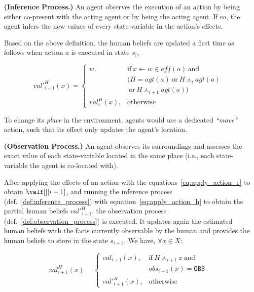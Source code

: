 \begin{definition} \label{def:inference_process}
    \textbf{(Inference Process.)} An agent observes the execution of an action by being either co-present with the acting agent 
    or by being the acting agent. If so, the agent infers the new values of every state-variable in the action's effects.
\end{definition}

Based on the above definition, the human beliefs are updated a first time as follows when action $a$ is executed in state $s_i$, 

\begin{equation} \label{eq:apply_action_h}
val'^H_{i+1}(x) = \left\{ 
\begin{array}{ll}
    w, & \mbox{if} ~ x \leftarrow w \in \textit{eff}(a) ~ \mbox{and}  \\ 
    & (H = \textit{agt}(a) ~\mbox{or}~ H \curlywedge_i \textit{agt}(a)\\
    & ~\mbox{or}~ H \curlywedge_{i+1} \textit{agt}(a))\\
    val^H_i(x), & \mbox{otherwise}
\end{array}\right.
\end{equation}

To change its \textit{place} in the environment, agents would use a dedicated \textit{``move''} action, such that its effect only updates the agent's location. 

\begin{definition} \label{def:observation_process}
    \textbf{(Observation Process.)} An agent observes its surroundings and assesses the exact value of each state-variable located in the same place (i.e., each state-variable the agent is co-located with).
\end{definition}

After applying the effects of an action with the equations~\ref{eq:apply_action_r} to obtain $\valf[][i+1]$, and running the inference process (def.~\ref{def:inference_process}) with equation~\ref{eq:apply_action_h} to obtain the partial human beliefs $val'^H_{i+1}$, the observation process (def.~\ref{def:observation_process}) is executed. It updates again the estimated human beliefs with the facts currently observable by the human and provides the human beliefs to store in the state $s_{i+1}$. We have, $\forall x \in X$:

\begin{equation}
val^H_{i+1}(x) = \left\{ 
\begin{array}{ll}
val_{i+1}(x), & \mbox{if}~ H \curlywedge_{i+1} x ~\mbox{and}~ \\
    & obs_{i+1}(x) = \texttt{OBS}\\
val'^H_{i+1}(x), & \mbox{otherwise}
\end{array}\right.
\end{equation}

